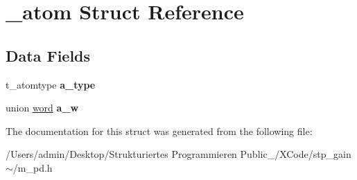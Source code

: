 \hypertarget{struct__atom}{}\section{\+\_\+atom Struct Reference}
\label{struct__atom}
\subsection*{Data Fields}
\begin{DoxyCompactItemize}
\item 
\mbox{\label{struct__atom_abfbcbf7ffdb9c9f8b2ef360ea5857210}} 
t\+\_\+atomtype {\bfseries a\+\_\+type}
\item 
\mbox{\label{struct__atom_a325629e2c919932ac1fe932036071bc7}} 
union \hyperlink{unionword}{word} {\bfseries a\+\_\+w}
\end{DoxyCompactItemize}


The documentation for this struct was generated from the following file\+:\begin{DoxyCompactItemize}
\item 
/\+Users/admin/\+Desktop/\+Strukturiertes Programmieren Public\+\_/\+X\+Code/stp\+\_\+gain$\sim$/m\+\_\+pd.\+h\end{DoxyCompactItemize}
